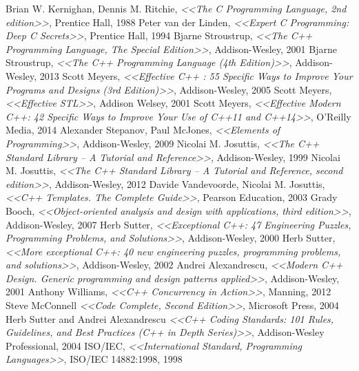 \documentclass[a4paper,12pt,oneside]{book}
\begin{document}
\pagebreak
{}
\begin{thebibliography}{99}
 Brian W. Kernighan, Dennis M. Ritchie, \textit{<<The C Programming Language, 2nd edition>>}, Prentice Hall, 1988
 Peter van der Linden, \textit{<<Expert C Programming: Deep C Secrets>>}, Prentice Hall, 1994
 Bjarne Stroustrup, \textit{<<The C++ Programming Language, The Special Edition>>}, Addison-Wesley, 2001
 Bjarne Stroustrup, \textit{<<The C++ Programming Language (4th Edition)>>}, Addison-Wesley, 2013
 Scott Meyers, \textit{<<Effective C++ : 55 Specific Ways to Improve Your Programs and Designs (3rd Edition)>>}, Addison-Wesley, 2005
 Scott Meyers, \textit{<<Effective STL>>}, Addison Welsey, 2001
 Scott Meyers, \textit{<<Effective Modern C++: 42 Specific Ways to Improve Your Use of C++11 and C++14>>}, O'Reilly Media, 2014
 Alexander Stepanov, Paul McJones, \textit{<<Elements of Programming>>}, Addison-Wesley, 2009
 Nicolai M. Josuttis, \textit{<<The C++ Standard Library -- A Tutorial and Reference>>}, Addison-Wesley, 1999
 Nicolai M. Josuttis, \textit{<<The C++ Standard Library -- A Tutorial and Reference, second edition>>}, Addison-Wesley, 2012
 Davide Vandevoorde, Nicolai M. Josuttis, \textit{<<C++ Templates. The Complete Guide>>}, Pearson Education, 2003
 Grady Booch, \textit{<<Object-oriented analysis and design with applications, third edition>>}, Addison-Wesley, 2007
 Herb Sutter, \textit{<<Exceptional C++: 47 Engineering Puzzles, Programming Problems, and Solutions>>}, Addison-Wesley, 2000
 Herb Sutter, \textit{<<More exceptional C++: 40 new engineering puzzles, programming problems, and solutions>>}, Addison-Wesley, 2002
 Andrei Alexandrescu, \textit{<<Modern C++ Design. Generic programming and design patterns applied>>}, Addison-Wesley, 2001
 Anthony Williams, \textit{<<C++ Concurrency in Action>>}, Manning, 2012
 Steve McConnell \textit{<<Code Complete, Second Edition>>}, Microsoft Press, 2004
 Herb Sutter and Andrei Alexandrescu \textit{<<C++ Coding Standards: 101 Rules, Guidelines, and Best Practices (C++ in Depth Series)>>}, Addison-Wesley Professional, 2004
 ISO/IEC, \textit{<<International Standard, Programming Languages>>}, ISO/IEC 14882:1998, 1998

\end{thebibliography}
\end{document}
